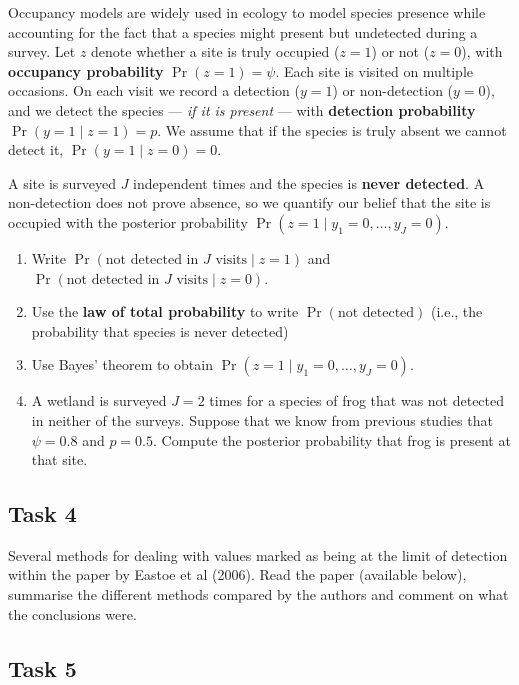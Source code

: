 \documentclass[
  letterpaper,
  DIV=11,
  numbers=noendperiod]{scrartcl}
\providecommand{\tightlist}{%
  \setlength{\itemsep}{0pt}\setlength{\parskip}{0pt}}\usepackage{longtable,booktabs,array}
\begin{document}
Occupancy models are widely used in ecology to model species presence
while accounting for the fact that a species might present but
undetected during a survey. Let \(z\) denote whether a site is truly
occupied (\(z = 1\)) or not (\(z = 0\)), with \textbf{occupancy
probability} \(\Pr(z = 1) = \psi\). Each site is visited on multiple
occasions. On each visit we record a detection (\(y = 1\)) or
non-detection (\(y = 0\)), and we detect the species --- \emph{if it is
present} --- with \textbf{detection probability}
\(\Pr(y = 1 \mid z = 1) = p\). We assume that if the species is truly
absent we cannot detect it, \(\Pr(y = 1 \mid z = 0) = 0\).

A site is surveyed \(J\) independent times and the species is
\textbf{never detected}. A non-detection does not prove absence, so we
quantify our belief that the site is occupied with the posterior
probability \(\Pr(z = 1 \mid y_1 = 0, \dots, y_J = 0)\).

\begin{enumerate}
\def\labelenumi{(\alph{enumi})}
\tightlist
\item
  Write \(\Pr(\text{not detected in } J \text{ visits} \mid z = 1)\) and
  \(\Pr(\text{not detected in } J \text{ visits} \mid z = 0)\).
\item
  Use the \textbf{law of total probability} to write
  \(\Pr(\text{not detected})\) (i.e., the probability that species is
  never detected)
\item
  Use Bayes' theorem to obtain
  \(\Pr(z = 1 \mid y_1 = 0, \dots, y_J = 0)\).
\item
  A wetland is surveyed \(J = 2\) times for a species of frog that was
  not detected in neither of the surveys. Suppose that we know from
  previous studies that \(\psi = 0.8\) and \(p = 0.5\). Compute the
  posterior probability that frog is present at that site.
\end{enumerate}

\subsection*{Task 4}\label{task-4}

Several methods for dealing with values marked as being at the limit of
detection within the paper by Eastoe et al (2006). Read the paper
(available below), summarise the different methods compared by the
authors and comment on what the conclusions were.

\subsection*{Task 5}\label{task-5}
\end{document}
